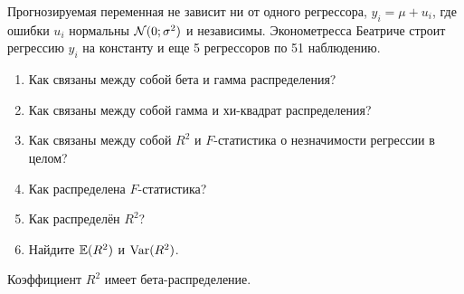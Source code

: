 \begin{problem}
Прогнозируемая переменная не зависит ни от одного регрессора, $y_i = \mu + u_i$, где ошибки $u_i$ нормальны $\mathcal{N}(0; \sigma^2)$ и независимы. Эконометресса Беатриче строит регрессию $y_i$ на константу и еще 5 регрессоров по 51 наблюдению.

\begin{enumerate}
\item Как связаны между собой бета и гамма распределения?
\item Как связаны между собой гамма и хи-квадрат распределения?
\item Как связаны между собой $R^2$ и $F$-статистика о незначимости регрессии в целом?
\item Как распределена $F$-статистика?
\item Как распределён $R^2$?
\item Найдите $\mathbb{E}(R^2)$ и $\operatorname{Var}(R^2)$.
\end{enumerate}

\begin{sol}
  Коэффициент $R^2$ имеет бета-распределение.
\end{sol}


\end{problem}






